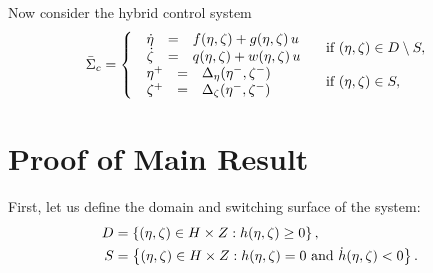 \documentclass[twocolumn]{article}
\begin{document}
Now consider the hybrid control system
\begin{align}
  \label{eq:hcsys}
        {\bar \Sigma}_{c} = \left\{
        \begin{array}{l l}
          \begin{array}{r c l}
            {\dot \eta} &=& f(\eta, \zeta) + g(\eta, \zeta) \, u\\
            {\dot \zeta} &=& q(\eta, \zeta) + w(\eta, \zeta) \, u
          \end{array} & \mbox{ if } (\eta, \zeta) \in D \setminus S,\\
          \begin{array}{r c l}
            \eta^{+} &=& \Delta_{\eta}(\eta^{-}, \zeta^{-})\\
            \zeta^{+} &=& \Delta_{\zeta}(\eta^{-}, \zeta^{-})
          \end{array} & \mbox{ if } (\eta, \zeta) \in S,
        \end{array}\right.
\end{align}

\section{Proof of Main Result}

First, let us define the domain and switching surface of the system:
\begin{align}
  D &= \left\{ (\eta, \zeta) \in H \times Z : h(\eta, \zeta) \geq 0 \right\},\\
  \nonumber
  S &= \left\{ (\eta, \zeta) \in H \times Z : h(\eta, \zeta) = 0 \mbox{ and } {\dot h}(\eta, \zeta) < 0 \right\}.
\end{align}
\end{document}
